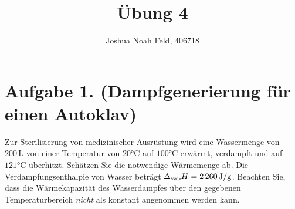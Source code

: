 \documentclass[german,12pt]{homework}
\title{Übung 4}
\author{Joshua Noah Feld, 406718}
\institute{RWTH Aachen University\\Aachener Verfahrenstechnik}
\begin{document}
    \maketitle

    \section*{Aufgabe 1. (Dampfgenerierung für einen Autoklav)}

    \begin{problem}
        Zur Sterilisierung von medizinischer Ausrüstung wird eine Wassermenge von \(200\,\si{\liter}\) von einer Temperatur von \(20\si{\degreeCelsius}\) auf \(100\si{\degreeCelsius}\) erwärmt, verdampft und auf \(121\si{\degreeCelsius}\) überhitzt. Schätzen Sie die notwendige Wärmemenge ab. Die Verdampfungsenthalpie von Wasser beträgt \(\Delta_\text{vap}H = 2\,260\,\si{\joule\per{\g}}\). Beachten Sie, dass die Wärmekapazität des Wasserdampfes über den gegebenen Temperaturbereich \emph{nicht} als konstant angenommen werden kann.
    \end{problem}
\end{document}

